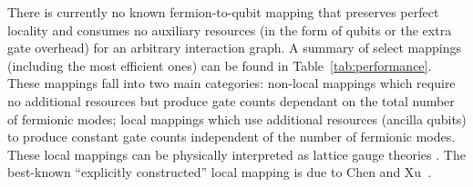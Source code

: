 There is currently no known fermion-to-qubit mapping that preserves perfect locality and consumes no auxiliary resources (in the form of qubits or the extra gate overhead) for an arbitrary interaction graph. A summary of select mappings (including the most efficient ones) can be found in Table~\ref{tab:performance}. These mappings fall into two main categories: non-local mappings which require no additional resources but produce gate counts dependant on the total number of fermionic modes; local mappings which use additional resources (ancilla qubits) to produce constant gate counts independent of the number of fermionic modes. These local mappings can be physically interpreted as lattice gauge theories \cite{Chen_2018}. The best-known “explicitly constructed” local mapping is due to Chen and Xu~\cite{chen2022equivalence}.  

